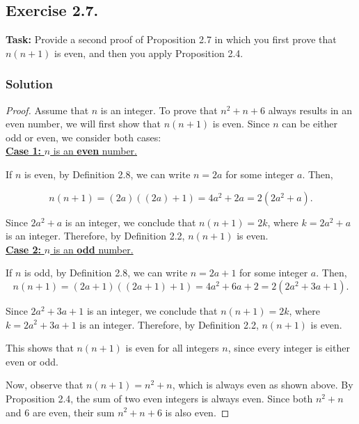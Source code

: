 \documentclass{article}
\begin{document}
\subsection{Exercise 2.7.}
\textbf{Task:} Provide a second proof of Proposition 2.7 in which you first prove that $n(n+1)$ is even, and then you apply Proposition 2.4.

\subsubsection*{Solution}

\begin{proof}
    Assume that $n$ is an integer. To prove that $n^2 + n + 6$ always results in an even number, we will first show that $n(n+1)$ is even. Since $n$ can be either odd or even, we consider both cases:\\
    
    \noindent \underline{\textbf{Case 1:} $n$ is an \textbf{even} number.}
    
    \noindent If $n$ is even, by Definition 2.8, we can write $n = 2a$ for some integer $a$. Then,
    
    \[
    n(n+1) = (2a)((2a)+1) = 4a^2 + 2a = 2(2a^2 + a).
    \]
    
    Since $2a^2 + a$ is an integer, we conclude that $n(n+1) = 2k$, where $k = 2a^2 + a$ is an integer. Therefore, by Definition 2.2, $n(n+1)$ is even.\\
    
    \noindent \underline{\textbf{Case 2:} $n$ is an \textbf{odd} number.}
    
    \noindent If $n$ is odd, by Definition 2.8, we can write $n = 2a + 1$ for some integer $a$. Then,
    \[
    n(n+1) = (2a+1)((2a+1)+1) = 4a^2 + 6a + 2 = 2(2a^2 + 3a + 1).
    \]
    
    Since $2a^2 + 3a + 1$ is an integer, we conclude that $n(n+1) = 2k$, where $k = 2a^2 + 3a + 1$ is an integer. Therefore, by Definition 2.2, $n(n+1)$ is even.
    
    This shows that $n(n+1)$ is even for all integers $n$, since every integer is either even or odd.
    
    Now, observe that $n(n+1) = n^2 + n$, which is always even as shown above. By Proposition 2.4, the sum of two even integers is always even. Since both $n^2 + n$ and 6 are even, their sum $n^2 + n + 6$ is also even.
\end{proof}

\newpage
\end{document}

